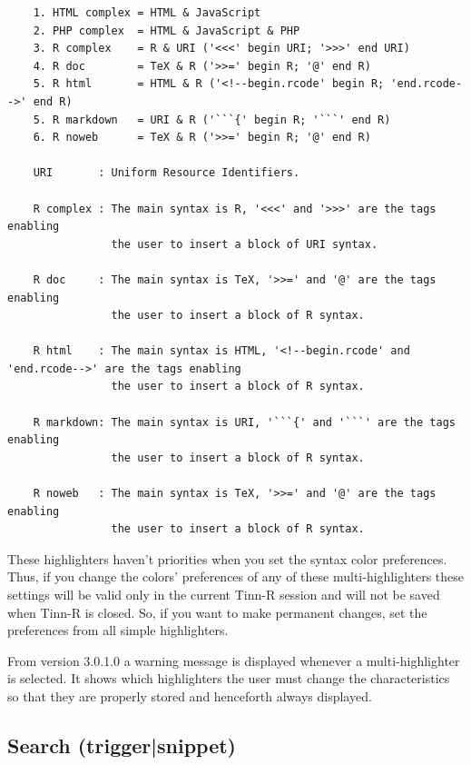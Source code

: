 \begin{footnotesize}
  \begin{verbatim}
    1. HTML complex = HTML & JavaScript
    2. PHP complex  = HTML & JavaScript & PHP
    3. R complex    = R & URI ('<<<' begin URI; '>>>' end URI)
    4. R doc        = TeX & R ('>>=' begin R; '@' end R)
    5. R html       = HTML & R ('<!--begin.rcode' begin R; 'end.rcode-->' end R)
    5. R markdown   = URI & R ('```{' begin R; '```' end R)
    6. R noweb      = TeX & R ('>>=' begin R; '@' end R)

    URI       : Uniform Resource Identifiers.

    R complex : The main syntax is R, '<<<' and '>>>' are the tags enabling
                the user to insert a block of URI syntax.

    R doc     : The main syntax is TeX, '>>=' and '@' are the tags enabling
                the user to insert a block of R syntax.

    R html    : The main syntax is HTML, '<!--begin.rcode' and 'end.rcode-->' are the tags enabling
                the user to insert a block of R syntax.

    R markdown: The main syntax is URI, '```{' and '```' are the tags enabling
                the user to insert a block of R syntax.

    R noweb   : The main syntax is TeX, '>>=' and '@' are the tags enabling
                the user to insert a block of R syntax.
  \end{verbatim}
\end{footnotesize}

These highlighters haven't priorities when you set the syntax color preferences.
Thus, if you change the colors' preferences of any of these multi-highlighters
these settings will be valid only in the current Tinn-R session and will not be
saved when Tinn-R is closed. So, if you want to make permanent changes, set the
preferences from all simple highlighters.

From version 3.0.1.0 a warning message is displayed whenever
a multi-highlighter is selected. It shows which highlighters the user
must change the characteristics so that they are properly stored and
henceforth always displayed.


\hypertarget{dlg_additional_dialogs_search_trigger}{}
\subsection{Search (trigger|snippet)}

